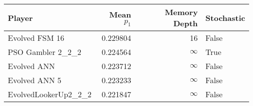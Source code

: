 \begin{tabular}{lrrl}
\toprule
               Player &  Mean $p_1$ &  Memory Depth & Stochastic \\
\midrule
       Evolved FSM 16 &    0.229804 &            16 &      False \\
    PSO Gambler 2\_2\_2 &    0.224564 &            \(\infty\) &       True \\
          Evolved ANN &    0.223712 &            \(\infty\) &      False \\
        Evolved ANN 5 &    0.223233 &            \(\infty\) &      False \\
 EvolvedLookerUp2\_2\_2 &    0.221847 &            \(\infty\) &      False \\
\bottomrule
\end{tabular}
